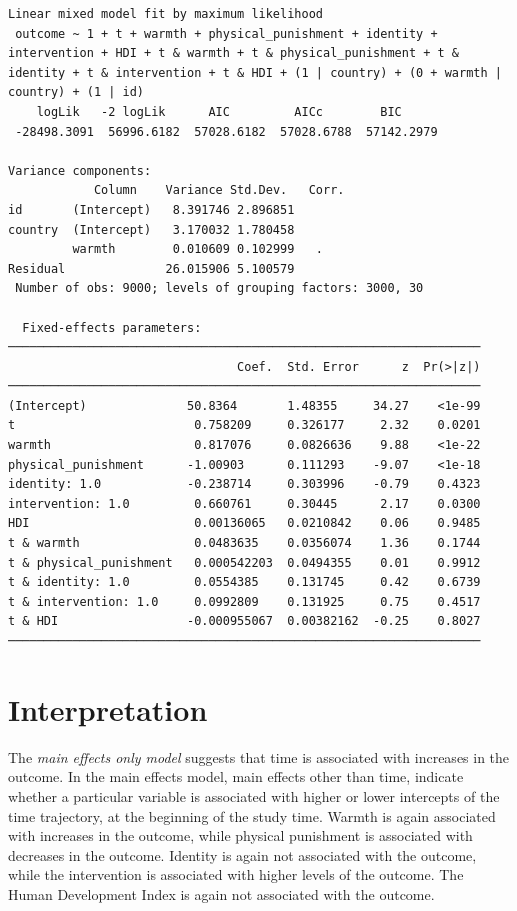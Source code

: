 \documentclass[
  letterpaper,
  DIV=11,
  numbers=noendperiod]{scrreprt}
\begin{document}
\begin{verbatim}
Linear mixed model fit by maximum likelihood
 outcome ~ 1 + t + warmth + physical_punishment + identity + intervention + HDI + t & warmth + t & physical_punishment + t & identity + t & intervention + t & HDI + (1 | country) + (0 + warmth | country) + (1 | id)
    logLik   -2 logLik      AIC         AICc        BIC     
 -28498.3091  56996.6182  57028.6182  57028.6788  57142.2979

Variance components:
            Column    Variance Std.Dev.   Corr.
id       (Intercept)   8.391746 2.896851
country  (Intercept)   3.170032 1.780458
         warmth        0.010609 0.102999   .  
Residual              26.015906 5.100579
 Number of obs: 9000; levels of grouping factors: 3000, 30

  Fixed-effects parameters:
──────────────────────────────────────────────────────────────────
                                Coef.  Std. Error      z  Pr(>|z|)
──────────────────────────────────────────────────────────────────
(Intercept)              50.8364       1.48355     34.27    <1e-99
t                         0.758209     0.326177     2.32    0.0201
warmth                    0.817076     0.0826636    9.88    <1e-22
physical_punishment      -1.00903      0.111293    -9.07    <1e-18
identity: 1.0            -0.238714     0.303996    -0.79    0.4323
intervention: 1.0         0.660761     0.30445      2.17    0.0300
HDI                       0.00136065   0.0210842    0.06    0.9485
t & warmth                0.0483635    0.0356074    1.36    0.1744
t & physical_punishment   0.000542203  0.0494355    0.01    0.9912
t & identity: 1.0         0.0554385    0.131745     0.42    0.6739
t & intervention: 1.0     0.0992809    0.131925     0.75    0.4517
t & HDI                  -0.000955067  0.00382162  -0.25    0.8027
──────────────────────────────────────────────────────────────────
\end{verbatim}

\section{Interpretation}\label{interpretation-3}

The \emph{main effects only model} suggests that time is associated with
increases in the outcome. In the main effects model, main effects other
than time, indicate whether a particular variable is associated with
higher or lower intercepts of the time trajectory, at the beginning of
the study time. Warmth is again associated with increases in the
outcome, while physical punishment is associated with decreases in the
outcome. Identity is again not associated with the outcome, while the
intervention is associated with higher levels of the outcome. The Human
Development Index is again not associated with the outcome.
\end{document}
